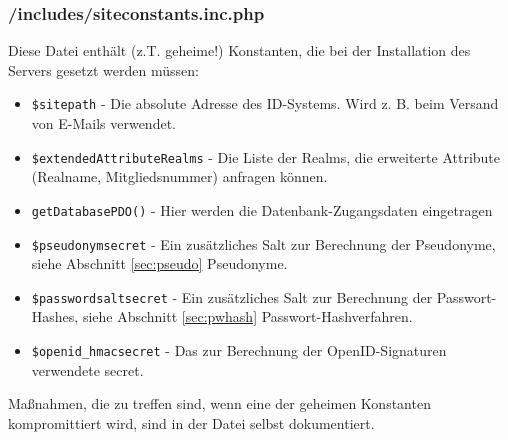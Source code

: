 \documentclass[parskip=half]{scrartcl}
\begin{document}
\subsubsection{/includes/siteconstants.inc.php}
Diese Datei enthält (z.T. geheime!) Konstanten, die bei der Installation des Servers gesetzt werden müssen:
\begin{itemize}
	\item \texttt{\$sitepath} - Die absolute Adresse des ID-Systems. Wird z. B. beim Versand von E-Mails verwendet.
	\item \texttt{\$extendedAttributeRealms} - Die Liste der Realms, die erweiterte Attribute (Realname, Mitgliedsnummer) anfragen können.
	\item \texttt{getDatabasePDO()} - Hier werden die Datenbank-Zugangsdaten eingetragen
	\item \texttt{\$pseudonymsecret} - Ein zusätzliches Salt zur Berechnung der Pseudonyme, siehe Abschnitt \ref{sec:pseudo} Pseudonyme.
	\item \texttt{\$passwordsaltsecret} - Ein zusätzliches Salt zur Berechnung der Passwort-Hashes, siehe Abschnitt \ref{sec:pwhash} Passwort-Hashverfahren.
	\item \texttt{\$openid\_hmacsecret} - Das zur Berechnung der OpenID-Signaturen verwendete secret. 
\end{itemize}
Maßnahmen, die zu treffen sind, wenn eine der geheimen Konstanten kompromittiert wird, sind in der Datei selbst dokumentiert.
\end{document}
